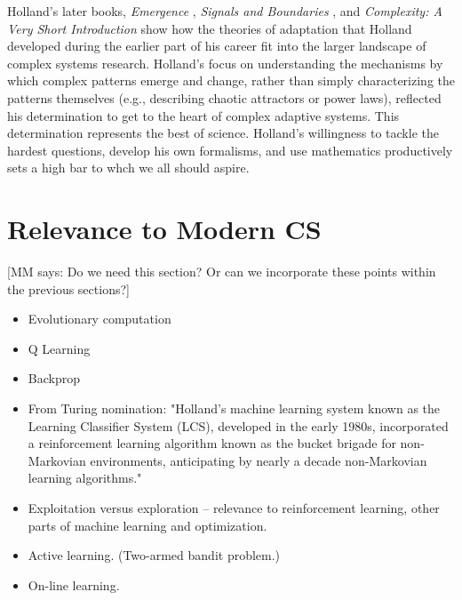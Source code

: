 \documentclass{sig-alternate}
\begin{document}



Holland's later books, \emph{Emergence} \cite{Holland2000},
\emph{Signals and Boundaries} \cite{Holland2012}, and
\emph{Complexity: A Very Short Introduction} \cite{Holland2014} show how the
theories of adaptation that Holland developed during the earlier part
of his career fit into the larger landscape of complex systems
research.  Holland's focus on understanding the mechanisms by which complex patterns emerge and change,
rather than simply characterizing the patterns themselves (e.g.,
describing chaotic attractors or power laws), reflected his
determination to get to the heart of complex adaptive systems.
This determination represents the best of science.  Holland's
willingness to tackle the hardest questions, develop his own
formalisms, and use mathematics productively sets a high bar to whch we
all should aspire.

\section{Relevance to Modern CS}
[MM says:  Do we need this section?  Or can we incorporate these points within the previous sections?]

\begin{itemize}
\item Evolutionary computation
\item Q Learning
\item Backprop
\item    From Turing nomination: "Holland's machine learning system known as the
   Learning Classifier System (LCS), developed in the early 1980s,
   incorporated a reinforcement learning algorithm known as the bucket
   brigade for non-Markovian environments, anticipating by nearly a
   decade non-Markovian learning algorithms."
\item Exploitation versus exploration -- relevance to reinforcement
  learning, other parts of machine learning and optimization.
\item Active learning.  (Two-armed bandit problem.) 
\item On-line learning.  
\end{itemize}
\end{document}

